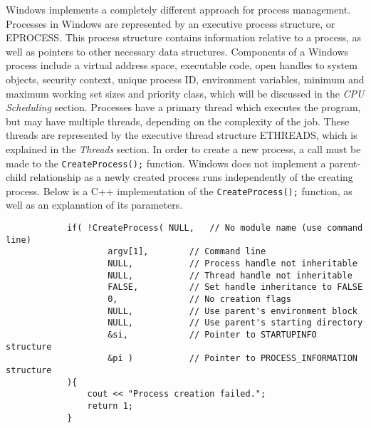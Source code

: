 \documentclass[10pt, onecolumn]{IEEEtran}
\begin{document}
        \vspace{3mm}
        
        Windows implements a completely different approach for process management. Processes in Windows are represented by an executive process structure, or EPROCESS\cite{windowspt}. This process structure contains information relative to a process, as well as pointers to other necessary data structures. Components of a Windows process include a virtual address space, executable code, open handles to system objects, security context, unique process ID, environment variables, minimum and maximum working set sizes and  priority class, which will be discussed in the \textit{CPU Scheduling} section. Processes have a primary thread which executes the program, but may have multiple threads, depending on the complexity of the job. These threads are represented by the executive thread structure ETHREADS, which is explained in the \textit{Threads} section. In order to create a new process, a call must be made to the \texttt{CreateProcess();} function. Windows does not implement a parent-child relationship as a newly created process runs independently of the creating process. Below is a C++ implementation of the \texttt{CreateProcess();} function, as well as an explanation of its parameters.
        
        \begin{lstlisting}
            if( !CreateProcess( NULL,   // No module name (use command line)
                    argv[1],        // Command line
                    NULL,           // Process handle not inheritable
                    NULL,           // Thread handle not inheritable
                    FALSE,          // Set handle inheritance to FALSE
                    0,              // No creation flags
                    NULL,           // Use parent's environment block
                    NULL,           // Use parent's starting directory 
                    &si,            // Pointer to STARTUPINFO structure
                    &pi )           // Pointer to PROCESS_INFORMATION structure
            ){
                cout << "Process creation failed.";
                return 1;
            }
        \end{lstlisting}
        
\end{document}
